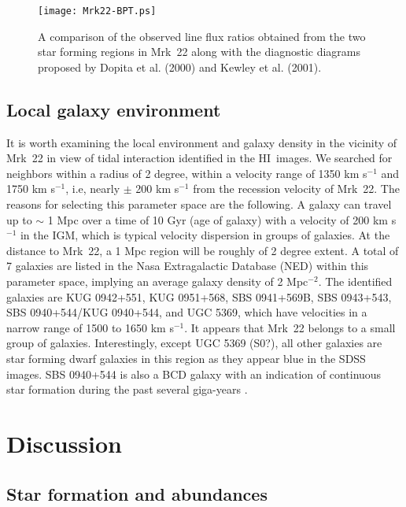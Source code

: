 \documentclass[useAMS,usenatbib]{mn2e}
\def\HI{H{\small{I}}~}
\begin{document}
\begin{figure}
\centering
\texttt{[image: Mrk22-BPT.ps]}
\caption{A comparison of the observed line flux ratios obtained from the two star forming regions in Mrk~22 along with the diagnostic diagrams proposed by Dopita et al. (2000) and Kewley et al. (2001).}
\label{fig:12}
\end{figure} 

\subsection{Local galaxy environment}

It is worth examining the local environment and galaxy density in the vicinity of Mrk~22 in view of tidal interaction identified in the \HI images. We searched for neighbors within a radius of 2 degree, within a velocity range of 1350 km s$^{-1}$ and 1750 km s$^{-1}$, i.e, nearly $\pm$ 200 km s$^{-1}$ from the  recession velocity of Mrk~22. The reasons for selecting this parameter space are the following. A galaxy can travel up to $\sim$ 1 Mpc over a time of 10 Gyr (age of galaxy) with a velocity of 200 km s$^{-1}$ in the IGM, which is typical velocity dispersion in groups of galaxies. At the distance to Mrk~22, a 1 Mpc region will be roughly of 2 degree extent. A total of 7 galaxies are listed in the Nasa Extragalactic Database (NED) within this parameter space, implying an average galaxy density of 2 Mpc$^{-2}$. The identified galaxies are KUG 0942+551, KUG 0951+568, SBS 0941+569B, SBS 0943+543, SBS 0940+544/KUG 0940+544, and UGC 5369, which have velocities in a narrow range of 1500 to 1650 km s$^{-1}$. It appears that Mrk~22 belongs to a small group of galaxies. Interestingly, except UGC 5369 (S0?), all other galaxies are star forming dwarf galaxies in this region as they appear blue in the SDSS images. SBS 0940+544 is also a BCD galaxy with an indication of continuous star formation during the past several giga-years \citep{2001A&A...378..756G}. 

\section{Discussion}

\subsection{Star formation and abundances}
\end{document}
